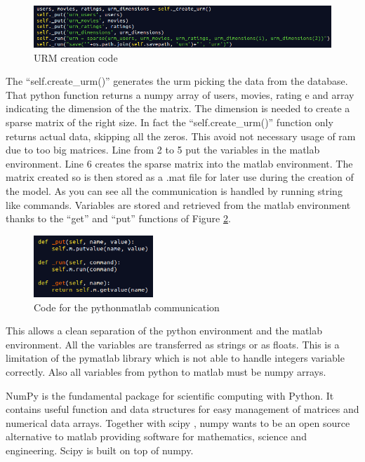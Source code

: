 \begin{figure}
  \centering
  \includegraphics[width=\textwidth]{figures/urm_creation_code.png}
  \caption{URM creation code}
  \label{fig:urm_creation_code}
\end{figure}

The ``self.create_urm()'' generates the urm picking the data from the database. That python function returns a numpy array of users, movies, rating e and array indicating the dimension of the the matrix. The dimension is needed to create a sparse matrix of the right size. In fact the ``self.create_urm()'' function only returns actual data, skipping all the zeros. This avoid not necessary usage of ram due to too big matrices. Line from 2 to 5 put the variables in the matlab environment. Line 6 creates the sparse matrix into the matlab environment. The matrix created so is then stored as a .mat file for later use during the creation of the model.
As you can see all the communication is handled by running string like commands. Variables are stored and retrieved from the matlab environment thanks to the ``get'' and ``put'' functions of Figure \ref{fig:matlab_put_get_code}.

\begin{figure}
  \centering
  \includegraphics[width=0.4\textwidth]{figures/matlab_put_get_code.png}
  \caption{Code for the python\-matlab communication}
  \label{fig:matlab_put_get_code}
\end{figure}

This allows a clean separation of the python environment and the matlab environment. All the variables are transferred as strings or as floats. This is a limitation of the pymatlab library which is not able to handle integers variable correctly. Also all variables from python to matlab must be numpy \cite{numpy} arrays.

NumPy is the fundamental package for scientific computing with Python. It contains useful function and data structures for easy management of matrices and numerical data arrays. Together with scipy \cite{scipy}, numpy wants to be an open source alternative to matlab providing software for mathematics, science and engineering. Scipy is built on top of numpy.

